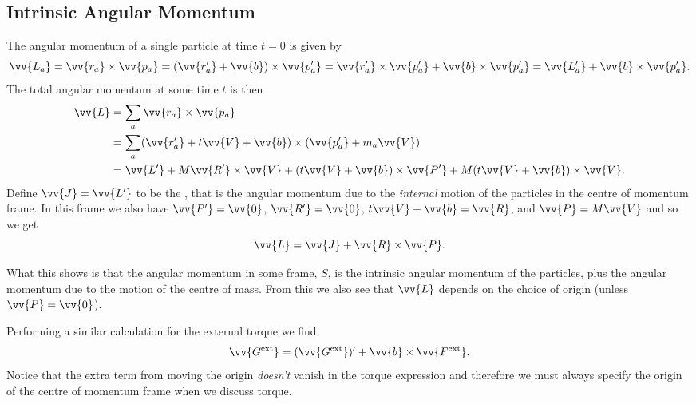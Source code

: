 \documentclass[fleqn]{NotesClass}
\newcommand*{\ext}{\mathrm{ext}}
\begin{document}
    \subsection{Intrinsic Angular Momentum}
    The angular momentum of a single particle at time \(t = 0\) is given by
    \begin{equation}
        \vv{L_a} = \vv{r_a} \times \vv{p_a} = (\vv{r_a'} + \vv{b})\times \vv{p_a'} = \vv{r_a'}\times\vv{p_a'} + \vv{b}\times\vv{p_a'} = \vv{L_a'} + \vv{b}\times\vv{p_a'}.
    \end{equation}
    The total angular momentum at some time \(t\) is then
    \begin{align}
        \vv{L} &= \sum_a \vv{r_a} \times \vv{p_a}\\
        &= \sum_a (\vv{r'_a} + t\vv{V} + \vv{b})\times (\vv{p_a'} + m_a\vv{V})\\
        &= \vv{L'} + M\vv{R'} \times \vv{V} + (t\vv{V} + \vv{b}) \times \vv{P'} + M(t\vv{V} + \vv{b})\times\vv{V}.
    \end{align}
    Define \(\vv{J} = \vv{L'}\) to be the , that is the angular momentum due to the \emph{internal} motion of the particles in the centre of momentum frame.
    In this frame we also have \(\vv{P'} = \vv{0}\), \(\vv{R'} = \vv{0}\), \(t\vv{V} + \vv{b} = \vv{R}\), and \(\vv{P} = M\vv{V}\) and so we get
    \begin{equation}
        \vv{L} = \vv{J} + \vv{R} \times \vv{P}.
    \end{equation}
    
    What this shows is that the angular momentum in some frame, \(S\), is the intrinsic angular momentum of the particles, plus the angular momentum due to the motion of the centre of mass.
    From this we also see that \(\vv{L}\) depends on the choice of origin (unless \(\vv{P} = \vv{0}\)).
    
    Performing a similar calculation for the external torque we find
    \begin{equation}
        \vv{G^{\ext}} = (\vv{G^{\ext}})' + \vv{b}\times\vv{F^{\ext}}.
    \end{equation}
    Notice that the extra term from moving the origin \emph{doesn't} vanish in the torque expression and therefore we must always specify the origin of the centre of momentum frame when we discuss torque.
    
\end{document}
